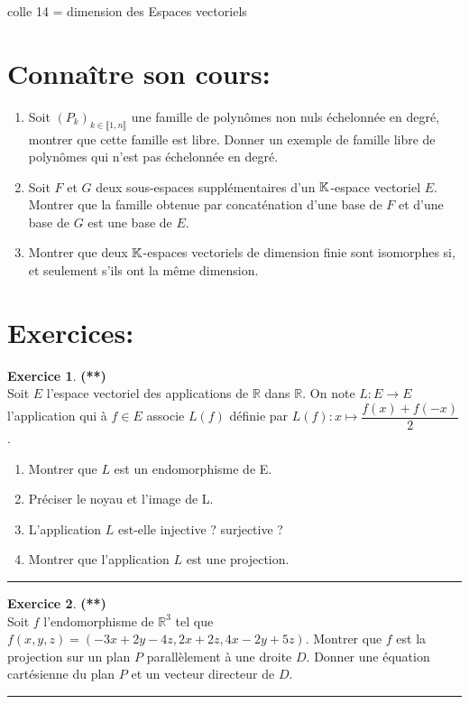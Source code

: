 \documentclass[a4paper,11pt]{article}
\theoremstyle{definition}
\newtheorem{exo}{Exercice} %
\begin{document}
	
	
	\begin{center}
		\Large \sc colle 14 = dimension des Espaces vectoriels
	\end{center}
\raggedright

\section*{Connaître son cours:}
\begin{enumerate}
	\item Soit $(P_k)_{k \in\llbracket 1,n\rrbracket} $ une famille de polynômes non nuls échelonnée en degré, montrer que cette famille est libre. Donner un exemple de famille libre de polynômes qui n'est pas échelonnée en degré.
	\item Soit $F$ et $G$ deux sous-espaces supplémentaires d’un $\mathbb{K}$-espace vectoriel $E$. Montrer que la famille obtenue par
	concaténation d'une base de $F$ et d’une base de $G$ est une base de $E $.
	\item Montrer que deux $\mathbb{K}$-espaces vectoriels de dimension finie sont isomorphes si, et seulement s’ils ont la même dimension.
	
\end{enumerate}

\section*{Exercices:} 	

\begin{exo}\textbf{(**)}\quad\\[0.25cm]
Soit $E$ l’espace vectoriel des applications de $\mathbb R$ dans $\mathbb R$. On note $L:E\to E$ l’application qui à $f\in E$ associe $L(f)$ définie par $L(f):x\mapsto \dfrac{f(x)+ f(-x)}{2}$.
\begin{enumerate}
	\item Montrer que $L$ est un endomorphisme de E.
	\item Préciser le noyau et l’image de L.
	\item L’application $L$ est-elle injective ? surjective ?
	\item Montrer que l’application $L$ est une projection. 
\end{enumerate}	
	
	\centering
	\rule{1\linewidth}{0.6pt}
\end{exo}
	
\begin{exo}\textbf{(**)}\quad\\[0.25cm]
Soit $f$ l'endomorphisme de $\mathbb R^3$ tel que $f(x,y,z)=(-3x+2y-4z,2x+2z,4x-2y+5z)$. Montrer que $f$ est la projection sur un plan $P$ parallèlement à une droite $D$. Donner une équation cartésienne du plan $P$ et un vecteur directeur de $D$.	
	
	\centering
	\rule{1\linewidth}{0.6pt}
\end{exo}
\end{document}
